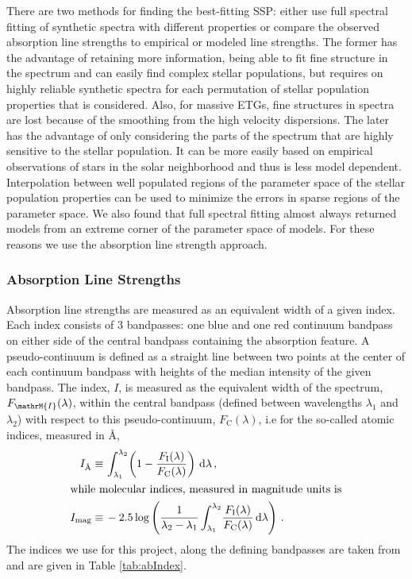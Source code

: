 	 	There are two methods for finding the best-fitting SSP: either use full spectral fitting of synthetic spectra with different properties or compare the observed absorption line strengths to empirical or modeled line strengths. The former has the advantage of retaining more information, being able to fit fine structure in the spectrum and can easily find complex stellar populations, but requires on highly reliable synthetic spectra for each permutation of stellar population properties that is considered. Also, for massive ETGs, fine structures in spectra are lost because of the smoothing from the high velocity dispersions. The later has the advantage of only considering the parts of the spectrum that are highly sensitive to the stellar population. It can be more easily based on empirical observations of stars in the solar neighborhood and thus is less model dependent. Interpolation between well populated regions of the parameter space of the stellar population properties can be used to minimize the errors in sparse regions of the parameter space. We also found that full spectral fitting almost always returned models from an extreme corner of the parameter space of models. For these reasons we use the absorption line strength approach.

	 	\subsubsection{Absorption Line Strengths}
	 		\label{subsubsec:Absorption}
	 		Absorption line strengths are measured as an equivalent width of a given index. Each index consists of 3 bandpasses: one blue and one red continuum bandpass on either side of the central bandpass containing the absorption feature. A pseudo-continuum is defined as a straight line between two points at the center of each continuum bandpass with heights of the median intensity of the given bandpass. The index, $I$, is measured as the equivalent width of the spectrum, $F_\mathrM{I}(\lambda)$, within the central bandpass (defined between wavelengths $\lambda_1$ and $\lambda_2$) with respect to this pseudo-continuum, $F_\mathrm{C}(\lambda)$, i.e for the so-called atomic indices, measured in \AA,
	 		\begin{align}
	 			I_\text{\AA} \equiv \, & \int^{\lambda_2}_{\lambda_1} \! \left(1 - \frac{F_\mathrm{I}(\lambda)}{F_\mathrm{C}(\lambda)}\right) \, \mathrm{d}\lambda \, , \\
	 		\intertext{while molecular indices, measured in magnitude units is}
	 			I_\text{mag} \equiv \, & -2.5 \log\left(\frac{1}{\lambda_2 - \lambda_1} \int^{\lambda_2}_{\lambda_1} \! \frac{F_\mathrm{I}(\lambda)}{F_\mathrm{C}(\lambda)} \, \mathrm{d}\lambda\right) \, .
	 		\end{align}
	 		The indices we use for this project, along the defining bandpasses are taken from \citet{Trager1998} and are given in Table \ref{tab:abIndex}.



